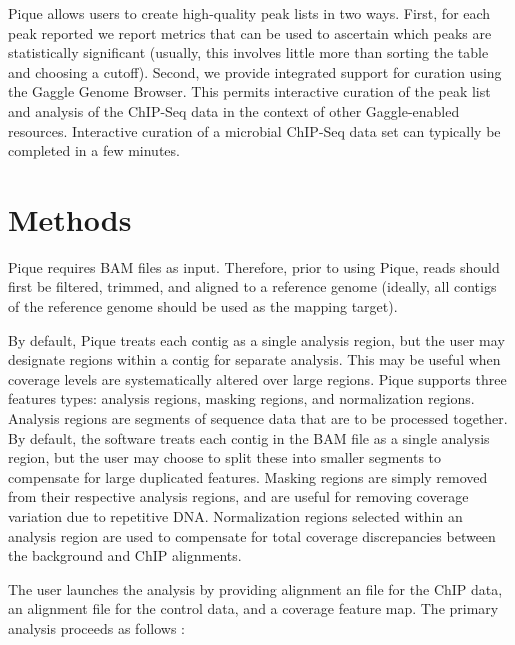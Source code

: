 Pique allows users to create high-quality peak lists in two ways.
First, for each peak reported we report metrics that can be used to
ascertain which peaks are statistically significant (usually, this
involves little more than sorting the table and choosing a
cutoff). Second, we provide integrated support for curation using the
Gaggle Genome Browser. \cite{gaggle_browser} This permits interactive
curation of the peak list and analysis of the ChIP-Seq data in the
context of other Gaggle-enabled resources. \cite{firegoose, gaggle}
Interactive curation of a microbial ChIP-Seq data set can typically be
completed in a few minutes.

\section{Methods}

\noindent Pique requires BAM files as input\cite{sam_format}.
Therefore, prior to using Pique, reads should first be filtered,
trimmed, and aligned to a reference genome (ideally, all contigs of
the reference genome should be used as the mapping target).

By default, Pique treats each contig as a single analysis region, but
the user may designate regions within a contig for separate analysis.
This may be useful when coverage levels are systematically altered
over large regions.  Pique supports three features types: analysis
regions, masking regions, and normalization regions. Analysis regions
are segments of sequence data that are to be processed together. By
default, the software treats each contig in the BAM file as a single
analysis region, but the user may choose to split these into smaller
segments to compensate for large duplicated features. Masking regions
are simply removed from their respective analysis regions, and are
useful for removing coverage variation due to repetitive DNA.
Normalization regions selected within an analysis region are used to
compensate for total coverage discrepancies between the background and
ChIP alignments.

The user launches the analysis by providing alignment an file for the
ChIP data, an alignment file for the control data, and a coverage
feature map. The primary analysis proceeds as follows :

